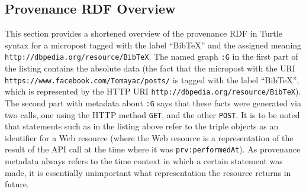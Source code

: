 \subsection{Provenance RDF Overview}                                           \label{sec:appendix}
This section provides a shortened overview of the provenance RDF in Turtle syntax for a  micropost tagged with the label ``BibTeX'' and the assigned
meaning \texttt{http://dbpedia.org/resource/BibTeX}. The named graph \texttt{:G} in the first part of the listing contains the absolute data (the fact that the  micropost with the URI \texttt{https://www.facebook.com/Tomayac/posts/} is tagged with the label ``BibTeX'', which is represented by the HTTP URI \texttt{http://dbpedia.org/resource/BibTeX}). The second part with metadata about \texttt{:G} says that these facts were generated via two calls, one using the HTTP method \texttt{GET}, and the other \texttt{POST}.
It is to be noted that statements such as in the listing above refer to the triple objects as an identifier for a Web resource (where the Web resource is a representation of the result of the API call at the time where it was \texttt{prv:performedAt}). As provenance metadata always refers to the time context in which a certain statement was made, it is essentially unimportant what representation the resource returns in future.

